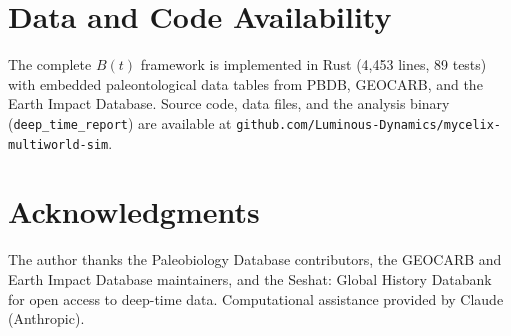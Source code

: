 \documentclass[10pt,letterpaper]{article}
\newcommand{\bt}{$B(t)$}
\begin{document}
\section*{Data and Code Availability}

The complete \bt{} framework is implemented in Rust (4,453 lines, 89 tests)
with embedded paleontological data tables from PBDB, GEOCARB, and the Earth
Impact Database. Source code, data files, and the analysis binary
(\texttt{deep\_time\_report}) are available at
\texttt{github.com/Luminous-Dynamics/mycelix-multiworld-sim}.

\section*{Acknowledgments}

The author thanks the Paleobiology Database contributors, the GEOCARB and
Earth Impact Database maintainers, and the Seshat: Global History Databank
for open access to deep-time data. Computational assistance provided by
Claude (Anthropic).
\end{document}
